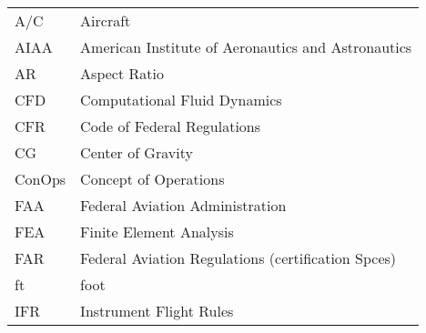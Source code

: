 {\renewcommand\arraystretch{1.0}
\noindent\begin{longtable*}{@{}l @{\quad=\quad} l@{}}
    A/C & Aircraft \\
    AIAA & American Institute of Aeronautics and Astronautics \\
    AR & Aspect Ratio \\
    CFD & Computational Fluid Dynamics \\
    CFR & Code of Federal Regulations \\
    CG & Center of Gravity \\
    ConOps & Concept of Operations \\
    FAA & Federal Aviation Administration \\
    FEA & Finite Element Analysis \\
    FAR & Federal Aviation Regulations (certification Spces) \\
    ft & foot \\
    IFR & Instrument Flight Rules \\

\end{longtable*}}
